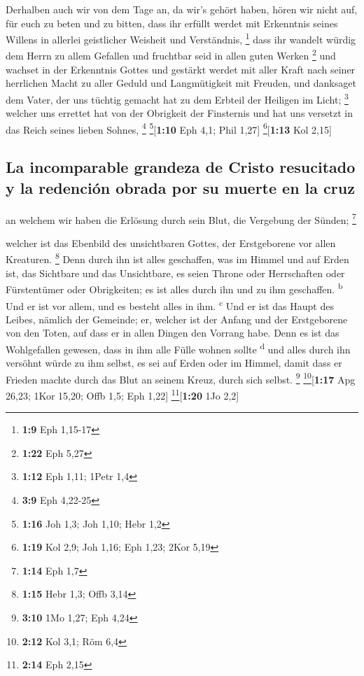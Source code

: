  Derhalben auch wir von dem Tage an, da wir's gehört
haben, hören wir nicht auf, für euch zu beten und zu bitten, dass ihr
erfüllt werdet mit Erkenntnis seines Willens in allerlei geistlicher
Weisheit und Verständnis, \footnote{\textbf{1:9} Eph 1,15-17}
 dass ihr wandelt würdig dem Herrn zu allem Gefallen und
fruchtbar seid in allen guten Werken \footnote{\textbf{1:22} Eph 5,27}
 und wachset in der Erkenntnis Gottes und gestärkt werdet
mit aller Kraft nach seiner herrlichen Macht zu aller Geduld und
Langmütigkeit mit Freuden,  und danksaget dem Vater, der
uns tüchtig gemacht hat zu dem Erbteil der Heiligen im Licht;
\footnote{\textbf{1:12} Eph 1,11; 1Petr 1,4}  welcher uns
errettet hat von der Obrigkeit der Finsternis und hat uns versetzt in
das Reich seines lieben Sohnes, \footnote{\textbf{3:9} Eph 4,22-25}
\footnote{\textbf{1:16} Joh 1,3; Joh 1,10; Hebr 1,2}{[}\textbf{1:10} Eph
4,1; Phil 1,27{]} \footnote{\textbf{1:19} Kol 2,9; Joh 1,16; Eph 1,23;
  2Kor 5,19}{[}\textbf{1:13} Kol 2,15{]}

\hypertarget{la-incomparable-grandeza-de-cristo-resucitado-y-la-redenciuxf3n-obrada-por-su-muerte-en-la-cruz}{%
\subsection{La incomparable grandeza de Cristo resucitado y la redención
obrada por su muerte en la
cruz}\label{la-incomparable-grandeza-de-cristo-resucitado-y-la-redenciuxf3n-obrada-por-su-muerte-en-la-cruz}}

 an welchem wir haben die Erlösung durch sein Blut, die
Vergebung der Sünden; \footnote{\textbf{1:14} Eph 1,7}

 welcher ist das Ebenbild des unsichtbaren Gottes, der
Erstgeborene vor allen Kreaturen. \footnote{\textbf{1:15} Hebr 1,3; Offb
  3,14}  Denn durch ihn ist alles geschaffen, was im
Himmel und auf Erden ist, das Sichtbare und das Unsichtbare, es seien
Throne oder Herrschaften oder Fürstentümer oder Obrigkeiten; es ist
alles durch ihn und zu ihm geschaffen. \textsuperscript{b}
 Und er ist vor allem, und es besteht alles in ihm.
\textsuperscript{c}  Und er ist das Haupt des Leibes,
nämlich der Gemeinde; er, welcher ist der Anfang und der Erstgeborene
von den Toten, auf dass er in allen Dingen den Vorrang habe.
 Denn es ist das Wohlgefallen gewesen, dass in ihm alle
Fülle wohnen sollte \textsuperscript{d}  und alles durch
ihn versöhnt würde zu ihm selbst, es sei auf Erden oder im Himmel, damit
dass er Frieden machte durch das Blut an seinem Kreuz, durch sich
selbst. \footnote{\textbf{3:10} 1Mo 1,27; Eph 4,24}
\footnote{\textbf{2:12} Kol 3,1; Röm 6,4}{[}\textbf{1:17} Apg 26,23;
1Kor 15,20; Offb 1,5; Eph 1,22{]} \footnote{\textbf{2:14} Eph 2,15}{[}\textbf{1:20}
1Jo 2,2{]}

